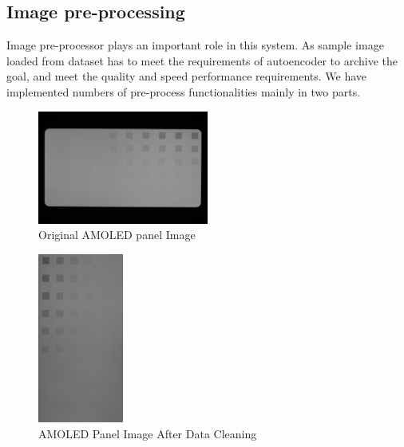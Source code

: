 \documentclass[runningheads]{llncs}
\begin{document}
\subsection{Image pre-processing}
Image pre-processor plays an important role in this system. As sample image loaded from dataset has to meet the requirements of autoencoder to archive the goal, and meet the quality and speed performance requirements.  We have implemented numbers of pre-process functionalities mainly in two parts. \\
\begin{figure}
    \centering
    \includegraphics[width=0.5\textwidth]{Pixel2-uncomp-original.jpeg}
    \caption{Original AMOLED panel Image}
    \label{fig:4}
\end{figure}
\begin{figure}
    \centering
    \includegraphics[width=0.25\textwidth, angle=270]{Pixel2-Uncomp-g.jpeg}
    \caption{AMOLED Panel Image After Data Cleaning}
    \label{fig:5}
\end{figure}
\end{document}
